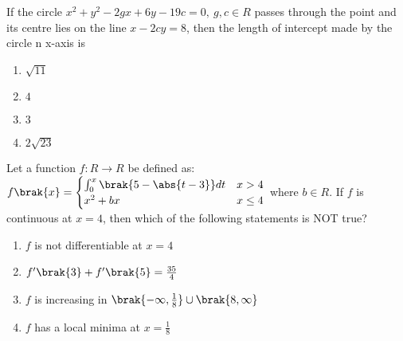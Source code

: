     \item If the circle $x^2+y^2-2gx+6y-19c=0,\ g,c\in R$ passes through the point  and its centre lies on the line $x-2cy=8$, then the length of intercept made by the circle n x-axis is 

		\begin{multicols}{4}
			\begin{enumerate}
				\item $\sqrt{11}$
				\item $4$
				\item $3$
				\item $2\sqrt{23}$
			\end{enumerate}
		\end{multicols}

    \item Let a function $f:R\to R$ be defined as:
    $f\brak{x}=
    \begin{cases}
    \int_0^x\brak{5-\abs{t-3}}dt & x>4\\
    x^2+bx & x\leq 4
    \end{cases}
    $ where $b\in R$. If $f$ is continuous at $x=4$, then which of the following statements is NOT true?

		\begin{multicols}{2}
			\begin{enumerate}
				\item $f$ is not differentiable at $x=4$
				\item $f'\brak{3}+f'\brak{5}=\frac{35}{4}$
				\item $f$ is increasing in $\brak{-\infty, \frac{1}{8}}\cup\brak{8,\infty}$
				\item $f$ has a local minima at $x=\frac{1}{8}$
			\end{enumerate}
		\end{multicols}
  
